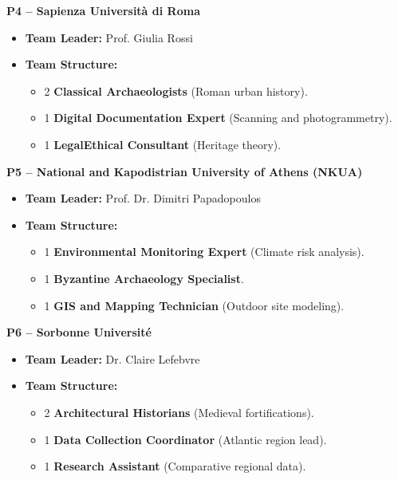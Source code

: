 \noindent
\textbf{P4 – Sapienza Università di Roma}
\begin{itemize}
  \item \textbf{Team Leader:} Prof. Giulia Rossi
  \item \textbf{Team Structure:} 
    \begin{itemize}
      \item 2 \textbf{Classical Archaeologists} (Roman urban history).
      \item 1 \textbf{Digital Documentation Expert} (Scanning and photogrammetry).
      \item 1 \textbf{Legal\/Ethical Consultant} (Heritage theory).
    \end{itemize}
\end{itemize}

\noindent
\textbf{P5 – National and Kapodistrian University of Athens (NKUA)}
\begin{itemize}
  \item \textbf{Team Leader:} Prof. Dr. Dimitri Papadopoulos
  \item \textbf{Team Structure:} 
    \begin{itemize}
      \item 1 \textbf{Environmental Monitoring Expert} (Climate risk analysis).
      \item 1 \textbf{Byzantine Archaeology Specialist}.
      \item 1 \textbf{GIS and Mapping Technician} (Outdoor site modeling).
    \end{itemize}
\end{itemize}

\noindent
\textbf{P6 – Sorbonne Université}
\begin{itemize}
  \item \textbf{Team Leader:} Dr. Claire Lefebvre
  \item \textbf{Team Structure:} 
    \begin{itemize}
      \item 2 \textbf{Architectural Historians} (Medieval fortifications).
      \item 1 \textbf{Data Collection Coordinator} (Atlantic region lead).
      \item 1 \textbf{Research Assistant} (Comparative regional data).
    \end{itemize}
\end{itemize}